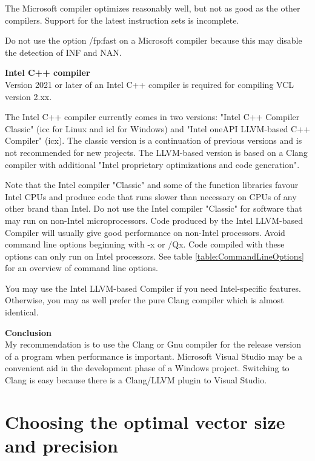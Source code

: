 \documentclass[vcl_manual.tex]{subfiles}
\begin{document}
The Microsoft compiler optimizes reasonably well, but not as good as the other compilers. Support for the latest instruction sets is incomplete.

Do not use the option /fp:fast on a Microsoft compiler because
this may disable the detection of INF and NAN.

\textbf{Intel C++ compiler}\\
Version 2021 or later of an Intel C++ compiler is required for compiling VCL version 2.xx.

The Intel C++ compiler currently comes in two versions: "Intel C++ Compiler Classic" (icc for Linux and icl for Windows) and "Intel oneAPI LLVM-based C++ Compiler" (icx). The classic version is a continuation of previous versions and is not recommended for new projects. The LLVM-based version is based on a Clang compiler with additional "Intel proprietary optimizations and code generation".

Note that the Intel compiler "Classic" and some of the function libraries favour Intel CPUs and produce code that runs slower than necessary on CPUs of any other brand than Intel. Do not use the Intel compiler "Classic" for software that may run on non-Intel microprocessors. Code produced by the Intel LLVM-based Compiler will usually give good performance on non-Intel processors. Avoid command line options beginning with -x or /Qx. Code compiled with these options can only run on Intel processors. See table \ref{table:CommandLineOptions} for an overview of command line options.

You may use the Intel LLVM-based Compiler if you need Intel-specific features. Otherwise, you may as well prefer the pure Clang compiler which is almost identical.

\textbf{Conclusion}\\
My recommendation is to use the Clang or Gnu compiler for the release version of a program when performance is important. Microsoft Visual Studio may be a convenient aid in the development phase of a Windows project. Switching to Clang is easy because there is a Clang/LLVM plugin to Visual Studio. 


\section{Choosing the optimal vector size and precision} \label{ChoosingOptimalVectorSize}
\end{document}
